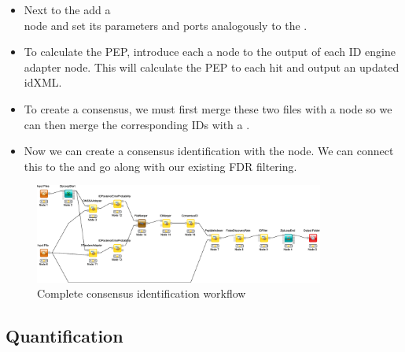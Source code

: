 \begin{itemize}
\item
Next to the  add a  \\
 node and set its parameters and ports analogously to the .
\item
To calculate the PEP, introduce each a   node to the output of each ID engine adapter node.
This will calculate the PEP to each hit and output an updated idXML.
\item
To create a consensus, we must first merge these two files with a  node  so we can then merge the corresponding IDs with a  .
\item
Now we can create a consensus identification with the   node.
We can connect this to the  and go along with our existing FDR filtering.
\end{itemize}

\begin{figure}[htbp]
  \centering
  \includegraphics[width=0.85\textwidth]{graphics/labelfree/consensus_id}
  \caption{Complete consensus identification workflow}
  \label{fig:consensusid}
\end{figure}


\subsection{Quantification}
\label{Labelfree_Quantification}

